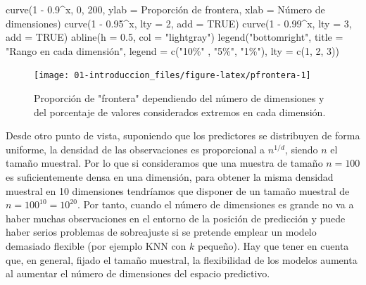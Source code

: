 \documentclass[
]{book}
\newenvironment{Shaded}{\begin{snugshade}}{\end{snugshade}}
\newcommand{\AttributeTok}[1]{\textcolor[rgb]{0.77,0.63,0.00}{#1}}
\newcommand{\ConstantTok}[1]{\textcolor[rgb]{0.00,0.00,0.00}{#1}}
\newcommand{\DecValTok}[1]{\textcolor[rgb]{0.00,0.00,0.81}{#1}}
\newcommand{\FloatTok}[1]{\textcolor[rgb]{0.00,0.00,0.81}{#1}}
\newcommand{\FunctionTok}[1]{\textcolor[rgb]{0.00,0.00,0.00}{#1}}
\newcommand{\NormalTok}[1]{#1}
\newcommand{\SpecialCharTok}[1]{\textcolor[rgb]{0.00,0.00,0.00}{#1}}
\newcommand{\StringTok}[1]{\textcolor[rgb]{0.31,0.60,0.02}{#1}}
\theoremstyle{break}
\theoremstyle{nonumberplain}
\begin{document}
\begin{Shaded}
\begin{Highlighting}[]
\FunctionTok{curve}\NormalTok{(}\DecValTok{1} \SpecialCharTok{{-}} \FloatTok{0.9}\SpecialCharTok{\^{}}\NormalTok{x, }\DecValTok{0}\NormalTok{, }\DecValTok{200}\NormalTok{, }\AttributeTok{ylab =} \StringTok{\textquotesingle{}Proporción de frontera\textquotesingle{}}\NormalTok{, }
      \AttributeTok{xlab =} \StringTok{\textquotesingle{}Número de dimensiones\textquotesingle{}}\NormalTok{)}
\FunctionTok{curve}\NormalTok{(}\DecValTok{1} \SpecialCharTok{{-}} \FloatTok{0.95}\SpecialCharTok{\^{}}\NormalTok{x, }\AttributeTok{lty =} \DecValTok{2}\NormalTok{, }\AttributeTok{add =} \ConstantTok{TRUE}\NormalTok{)}
\FunctionTok{curve}\NormalTok{(}\DecValTok{1} \SpecialCharTok{{-}} \FloatTok{0.99}\SpecialCharTok{\^{}}\NormalTok{x, }\AttributeTok{lty =} \DecValTok{3}\NormalTok{, }\AttributeTok{add =} \ConstantTok{TRUE}\NormalTok{)}
\FunctionTok{abline}\NormalTok{(}\AttributeTok{h =} \FloatTok{0.5}\NormalTok{, }\AttributeTok{col =} \StringTok{"lightgray"}\NormalTok{)}
\FunctionTok{legend}\NormalTok{(}\StringTok{"bottomright"}\NormalTok{, }\AttributeTok{title =} \StringTok{"Rango en cada dimensión"}\NormalTok{, }
       \AttributeTok{legend =} \FunctionTok{c}\NormalTok{(}\StringTok{"10\%"}\NormalTok{ , }\StringTok{"5\%"}\NormalTok{, }\StringTok{"1\%"}\NormalTok{), }\AttributeTok{lty =} \FunctionTok{c}\NormalTok{(}\DecValTok{1}\NormalTok{, }\DecValTok{2}\NormalTok{, }\DecValTok{3}\NormalTok{))}
\end{Highlighting}
\end{Shaded}

\begin{figure}[!htb]

{\centering \texttt{[image: 01-introduccion\_files/figure-latex/pfrontera-1]} 

}

\caption{Proporción de "frontera" dependiendo del número de dimensiones y del porcentaje de valores considerados extremos en cada dimensión.}\label{fig:pfrontera}
\end{figure}

Desde otro punto de vista, suponiendo que los predictores se distribuyen de forma uniforme, la densidad de las observaciones es proporcional a \(n^{1/d}\), siendo \(n\) el tamaño muestral.
Por lo que si consideramos que una muestra de tamaño \(n=100\) es suficientemente densa en una dimensión, para obtener la misma densidad muestral en 10 dimensiones tendríamos que disponer de un tamaño muestral de \(n = 100^{10} = 10^{20}\).
Por tanto, cuando el número de dimensiones es grande no va a haber muchas observaciones en el entorno de la posición de predicción y puede haber serios problemas de sobreajuste si se pretende emplear un modelo demasiado flexible (por ejemplo KNN con \(k\) pequeño).
Hay que tener en cuenta que, en general, fijado el tamaño muestral, la flexibilidad de los modelos aumenta al aumentar el número de dimensiones del espacio predictivo.
\end{document}
